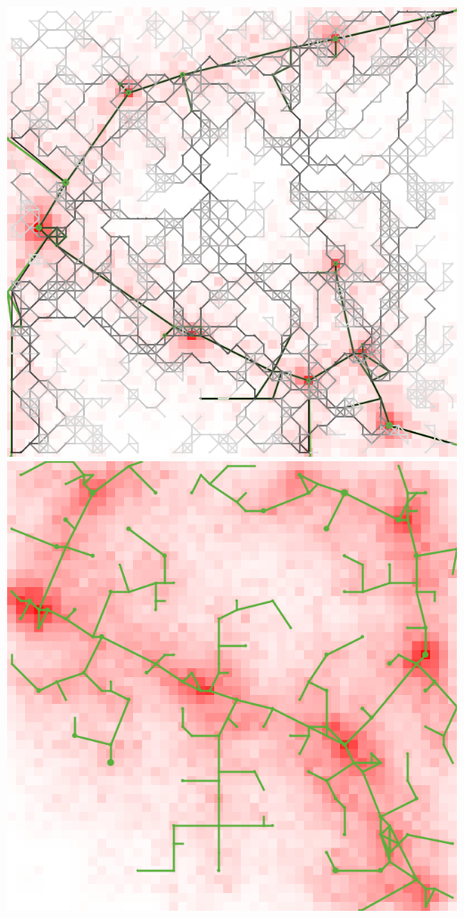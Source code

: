 \documentclass[english,11pt]{beamer}
\begin{document}
{\begin{columns}
\centering
\includegraphics[width=\textwidth]{figures/corr_example-bio-process-0}\hspace{0.1cm}\\
\includegraphics[width=\textwidth]{figures/corr_example-heuristic-0}


\end{columns}
}
\end{document}

